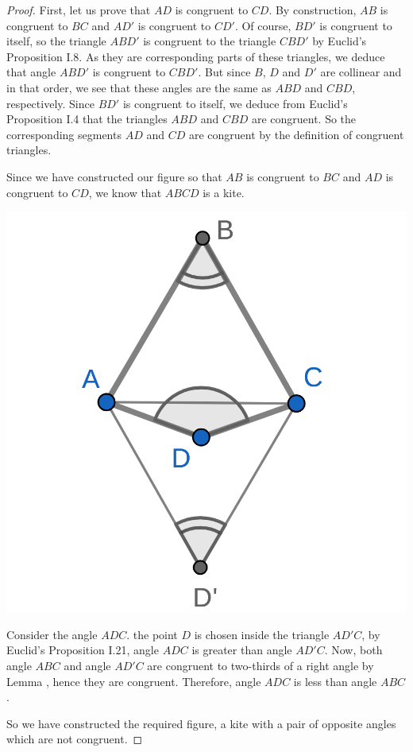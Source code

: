 \documentclass{tufte-handout}
\theoremstyle{definition}
\begin{document}
\begin{proof}
First, let us prove that $AD$ is congruent to $CD$. By construction, $AB$ is congruent to $BC$ and $AD'$ is congruent to $CD'$. Of course, $BD'$ is congruent to itself, so the triangle $ABD'$ is congruent to the triangle $CBD'$ by Euclid's Proposition I.8. As they are corresponding parts of these triangles, we deduce that angle $ABD'$ is congruent to $CBD'$. But since $B$, $D$ and $D'$ are collinear and in that order, we see that these angles are the same as $ABD$ and $CBD$, respectively. Since $BD'$ is congruent to itself, we deduce from Euclid's Proposition I.4 that the triangles $ABD$ and $CBD$ are congruent. So the corresponding segments $AD$ and $CD$ are congruent by the definition of congruent triangles.

Since we have constructed our figure so that $AB$ is congruent to $BC$ and $AD$ is congruent to $CD$, we know that $ABCD$ is a kite.

\begin{marginfigure}
  \includegraphics{images/kite_2.png}
\end{marginfigure}


Consider the angle $ADC$. the point $D$ is chosen inside the triangle $AD'C$, by Euclid's Proposition I.21, angle $ADC$ is greater than angle $AD'C$. Now, both angle $ABC$ and angle $AD'C$ are congruent to two-thirds of a right angle by Lemma \label{lemma:rhombus-equilateral-triangles}, hence they are congruent. Therefore, angle $ADC$ is less than angle $ABC$.

So we have constructed the required figure, a kite with a pair of opposite angles which are not congruent.
\end{proof}
\end{document}
